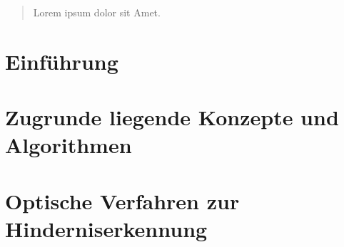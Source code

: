 \documentclass[pdftex,12pt,a4paper]{report}
\begin{document}

\deckblatt


\erklaerung


\begin{abstract}

Lorem ipsum dolor sit Amet.

\end{abstract}



\tableofcontents


\chapter{Einführung}
\label{chp:introduction}



%


\chapter{Zugrunde liegende Konzepte und Algorithmen}
\label{chp:concepts}



\chapter{Optische Verfahren zur Hinderniserkennung}
\label{chp:stateoftheart}

\end{document}
